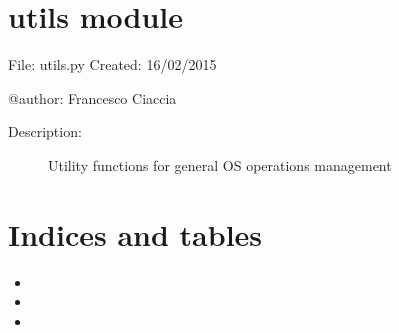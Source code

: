 \documentclass[letterpaper,10pt,oneside]{sphinxmanual}
\begin{document}
\chapter{utils module}
\label{utils:utils-module}\label{utils:module-utils}\label{utils::doc}
File:       utils.py
Created:    16/02/2015

@author:    Francesco Ciaccia
\begin{description}
\item[{Description:}] \leavevmode
Utility functions for general OS operations management

\end{description}

\begin{fulllineitems}
\label{utils:utils.mkdir_p}
\end{fulllineitems}



\chapter{Indices and tables}
\label{index:indices-and-tables}\begin{itemize}
\item {} 

\item {} 

\item {} 

\end{itemize}
\end{document}
